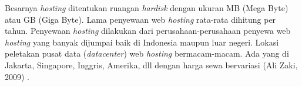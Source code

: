 Besarnya \textit{hosting} ditentukan ruangan \textit{hardisk} dengan ukuran MB (Mega Byte) atau GB (Giga Byte). Lama penyewaan web \textit{hosting} rata-rata dihitung per tahun. Penyewaan \textit{hosting} dilakukan dari perusahaan-perusahaan penyewa web \textit{hosting} yang banyak dijumpai baik di Indonesia maupun luar negeri. Lokasi peletakan pusat data (\textit{datacenter}) web \textit{hosting} bermacam-macam. Ada yang di Jakarta, Singapore, Inggris, Amerika, dll dengan harga sewa bervariasi (Ali Zaki, 2009) \cite{7}. 
